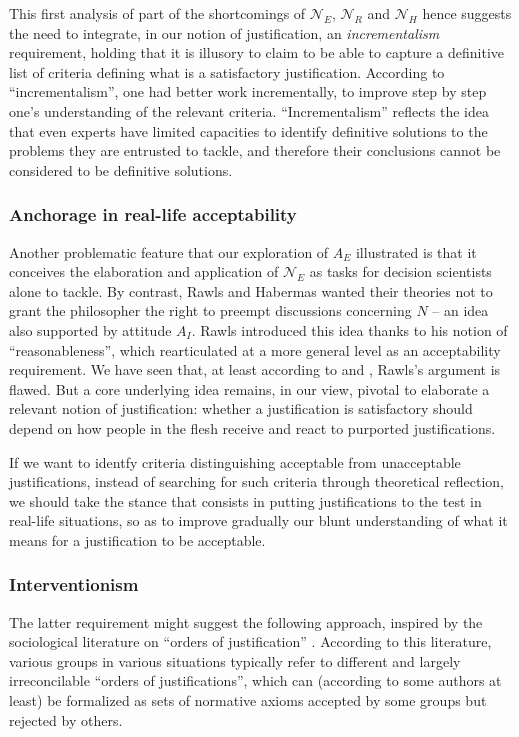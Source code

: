 \documentclass[preprint, french, english, 11pt, authoryear]{elsarticle}%
\begin{document}
This first analysis of part of the shortcomings of $\mathscr{N}_E$, $\mathscr{N}_{R}$ and $\mathscr{N}_{H}$ hence suggests the need to integrate, in our notion of justification, an \emph{incrementalism} requirement, 
holding that it is illusory to claim to be able to capture a definitive list of criteria defining what is a satisfactory justification. According to “incrementalism”, one had better work incrementally, to improve step by step one's understanding of the relevant criteria. 
“Incrementalism” reflects the idea that even experts have limited capacities to identify definitive solutions to the problems they are entrusted to tackle, and therefore their conclusions cannot be considered to be definitive solutions.

\subsubsection{Anchorage in real-life acceptability}
Another problematic feature that our exploration of $A_E$ illustrated is that it conceives the elaboration and application of $\mathscr{N}_E$ as tasks for decision scientists alone to tackle. 
By contrast, Rawls and Habermas wanted their theories not to grant the philosopher the right to preempt discussions concerning $N$ -- an idea also supported by attitude $A_I$. 
Rawls introduced this idea thanks to his notion of ``reasonableness'', which \citeauthor{estlund_democratic_2009} rearticulated at a more general level as an acceptability requirement. 
We have seen that, at least according to \citeauthor{habermas_reconciliation_1995} and \citeauthor{estlund_democratic_2009}, Rawls's argument is flawed. 
But a core underlying idea remains, in our view, pivotal to elaborate a relevant notion of justification: whether a justification is satisfactory should depend on how people in the flesh receive and react to purported justifications.
\begin{changebar}
If we want to identfy criteria distinguishing acceptable from unacceptable justifications, instead of searching for such criteria through theoretical reflection, we should take the stance that consists in putting justifications to the test in real-life situations, 
so as to improve gradually our blunt understanding of what it means for a justification to be acceptable.
\end{changebar}

\subsubsection{Interventionism}
The latter requirement might suggest the following approach, inspired by the sociological literature on “orders of justification” \citep{boltanski_justification_2006}. 
According to this literature, various groups in various situations typically refer to different and largely irreconcilable “orders of justifications”, which can (according to some authors at least) be formalized as sets of normative axioms accepted by some groups but rejected by others.
\end{document}
